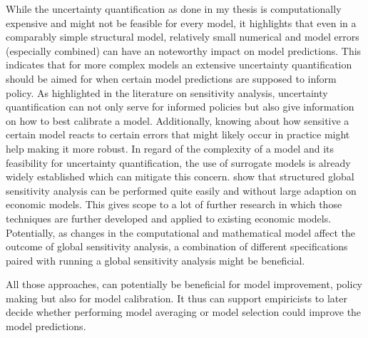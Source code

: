 While the uncertainty quantification as done in my thesis is computationally expensive and might not be feasible for every model, it highlights that even in a comparably simple structural model, relatively small numerical and model errors (especially combined) can have an noteworthy impact on model predictions. This indicates that for more complex models an extensive uncertainty quantification should be aimed for when certain model predictions are supposed to inform policy. As highlighted in the literature on sensitivity analysis, uncertainty quantification can not only serve for informed policies but also give information on how to best calibrate a model. Additionally, knowing about how sensitive a certain model reacts to certain errors that might likely occur in practice might help making it more robust. In regard of the complexity of a model and its feasibility for uncertainty quantification, the use of surrogate models is already widely established which can mitigate this concern. \cite{Harenberg.2019} show that structured global sensitivity analysis can be performed quite easily and without large adaption on economic models. This gives scope to a lot of further research in which those techniques are further developed and applied to existing economic models. Potentially, as changes in the computational and mathematical model affect the outcome of global sensitivity analysis, a combination of different specifications paired with running a global sensitivity analysis might be beneficial.

All those approaches, can potentially be beneficial for model improvement, policy making but also for model calibration. It thus can support empiricists to later decide whether performing model averaging or model selection could improve the model predictions.
